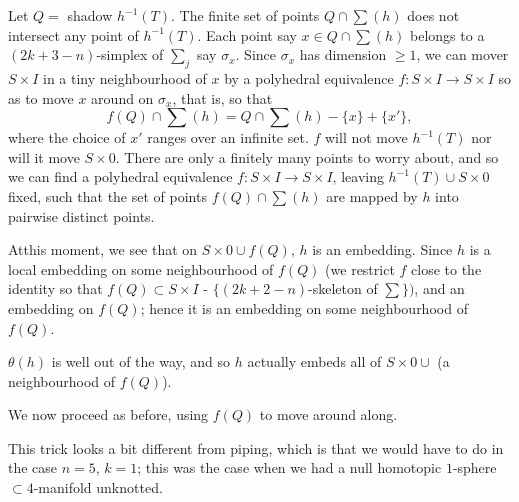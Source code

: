 Let $Q=$ shadow $h^{-1}(T)$. The finite set of points $Q\cap \sum(h)$ does not intersect any point of $h^{-1}(T)$. Each point say $x\in Q\cap \sum(h)$ belongs to a $(2k+3-n)$-simplex of $\sum_{j}$ say $\sigma_{x}$. Since $\sigma_{x}$ has dimension $\geq 1$, we can mover $S\times I$ in a tiny neighbourhood of $x$ by a polyhedral equivalence $f:S\times I\to S\times I$ so as to move $x$ around on $\sigma_{x}$, that is, so that 
$$
f(Q)\cap \sum(h)=Q\cap \sum(h)-\{x\}+\{x'\},
$$
where the choice of $x'$ ranges over an infinite set. $f$ will not move $h^{-1}(T)$ nor will it move $S\times 0$. There are only a finitely many points to worry about, and so we can find a polyhedral equivalence $f:S\times I\to S\times I$, leaving $h^{-1}(T)\cup S\times 0$ fixed, such that the set of points $f(Q)\cap \sum(h)$ are mapped by $h$ into pairwise distinct points. 

At\pageoriginale this moment, we see that on $S\times 0\cup f(Q)$, $h$ is an embedding. Since $h$ is a local embedding on some neighbourhood of $f(Q)$ (we restrict $f$ close to the identity so that $f(Q)\subset S\times I$ - $\{(2k+2-n)$-skeleton of $\sum\})$, and an embedding on $f(Q)$; hence it is an embedding on some neighbourhood of $f(Q)$.

$\theta(h)$ is well out of the way, and so $h$ actually embeds all of $S\times 0\cup$ (a neighbourhood of $f(Q)$).

We now proceed as before, using $f(Q)$ to move around along.

This trick looks a bit different from piping, which is that we would have to do in the case $n=5$, $k=1$; this was the case when we had a null homotopic $1$-sphere $\subset 4$-manifold unknotted. 

